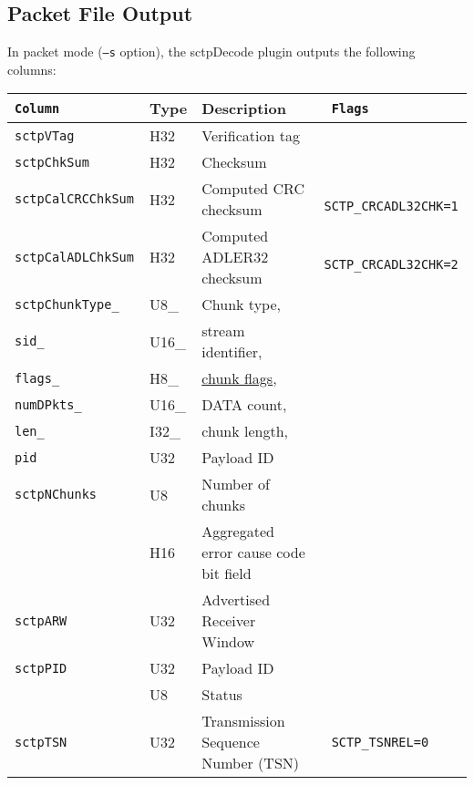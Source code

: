 \documentclass[documentation]{subfiles}
\begin{document}
\subsection{Packet File Output}
In packet mode ({\tt --s} option), the sctpDecode plugin outputs the following columns:
\begin{longtable}{>{\tt}lll>{\tt\small}l}
    \toprule
    {\bf Column}       & {\bf Type}   & {\bf Description}                           & {\bf Flags}\\
    \midrule\endhead%
    sctpVTag           & H32          & Verification tag                            & \\
    sctpChkSum         & H32          & Checksum                                    & \\
    sctpCalCRCChkSum   & H32          & Computed CRC checksum                       & SCTP\_CRCADL32CHK=1\\
    sctpCalADLChkSum   & H32          & Computed ADLER32 checksum                   & SCTP\_CRCADL32CHK=2\\
    sctpChunkType\_    & U8\_         & Chunk type,                                 & \\
    \qquad sid\_       & \qquad U16\_ & \qquad stream identifier,                   & \\
    \qquad flags\_     & \qquad H8\_  & \qquad \hyperref[sctpCFlags]{chunk flags},  & \\
    \qquad numDPkts\_  & \qquad U16\_ & \qquad DATA count,                          & \\
    \qquad len\_       & \qquad I32\_ & \qquad chunk length,                        & \\
    \qquad pid         & \qquad U32   & \qquad Payload ID                           & \\
    sctpNChunks        & U8           & Number of chunks                            & \\
    \nameref{sctpCCBF} & H16          & Aggregated error cause code bit field       & \\
    sctpARW            & U32          & Advertised Receiver Window                  & \\
    sctpPID            & U32          & Payload ID                                  & \\
    \nameref{sctpStat} & U8           & Status                                      & \\
    sctpTSN            & U32          & Transmission Sequence Number (TSN)          & SCTP\_TSNREL=0\\

\end{longtable}
\end{document}

